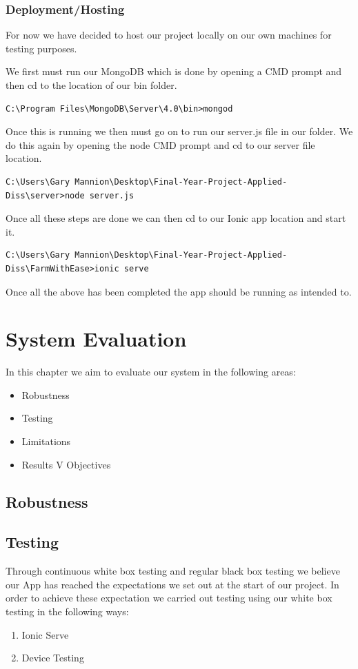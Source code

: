 \documentclass[12pt,a4paper,oneside,openany]{book}
\begin{document}
\subsection{Deployment/Hosting}
For now we have decided to host our project locally on our own machines for testing purposes.

We first must run our MongoDB which is done by opening a CMD prompt and then cd to the location of our bin folder.
\begin{verbatim}
C:\Program Files\MongoDB\Server\4.0\bin>mongod
\end{verbatim}

Once this is running we then must go on to run our server.js file in our folder. We do this again by opening the node CMD prompt and cd to our server file location.
\begin{verbatim}
C:\Users\Gary Mannion\Desktop\Final-Year-Project-Applied-Diss\server>node server.js
\end{verbatim}

Once all these steps are done we can then cd to our Ionic app location and start it.
\begin{verbatim}
C:\Users\Gary Mannion\Desktop\Final-Year-Project-Applied-Diss\FarmWithEase>ionic serve
\end{verbatim}

Once all the above has been completed the app should be running as intended to.

\chapter{System Evaluation}
In this chapter we aim to evaluate our system in the following areas:
\begin{itemize}
    \item Robustness
    \item Testing
    \item Limitations
    \item Results V Objectives
\end{itemize}

\section{Robustness}

\section{Testing}
Through continuous white box testing and regular black box testing we believe our App has reached the expectations we set out at the start of our project. In order to achieve these expectation we carried out testing using our white box testing in the following ways:
\begin{enumerate}
    \item Ionic Serve
    \item Device Testing
\end{enumerate}
\end{document}
